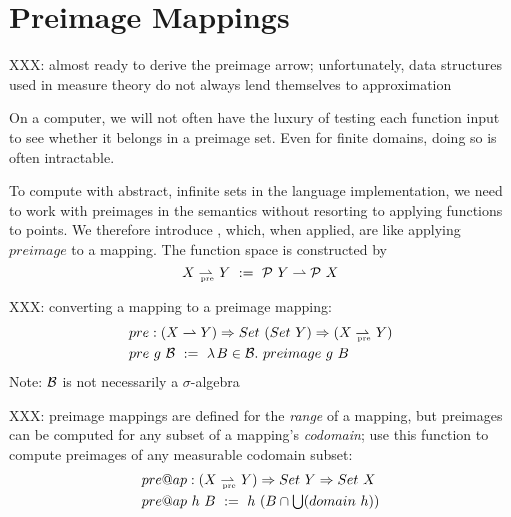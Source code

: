 \documentclass[preprint]{sigplanconf}
\newcommand{\pto}{\rightharpoonup}
\newcommand{\pre}{_\mathrm{pre}}
\newcommand{\prepto}{\pto_{\mspace{-19mu}\pre}}
\begin{document}

\section{Preimage Mappings}

XXX: almost ready to derive the preimage arrow; unfortunately, data structures used in measure theory do not always lend themselves to approximation

On a computer, we will not often have the luxury of testing each function input to see whether it belongs in a preimage set.
Even for finite domains, doing so is often intractable.

To compute with abstract, infinite sets in the language implementation, we need to work with preimages in the semantics without resorting to applying functions to points.
We therefore introduce , which, when applied, are like applying $preimage$ to a mapping.
The function space is constructed by
\begin{equation}
	X \prepto Y \ := \ \powerset~Y \pto \powerset~X
\end{equation}

XXX: converting a mapping to a preimage mapping:
\begin{equation}
\begin{aligned}
	&pre : (X \pto Y) \tto Set~(Set~Y) \tto (X \prepto Y) \\
	&pre~g~\B \ := \ \fun{B \in \B}{preimage~g~B}
\end{aligned}
\end{equation}
Note: $\mathcal{B}$ is not necessarily a $\sigma$-algebra

XXX: preimage mappings are defined for the \emph{range} of a mapping, but preimages can be computed for any subset of a mapping's \emph{codomain}; use this function to compute preimages of any measurable codomain subset:
\begin{equation}
\begin{aligned}
	&pre@ap : (X \prepto Y) \tto Set~Y \tto Set~X \\
	&pre@ap~h~B \ := \ h~(B \i \U(domain~h))
\end{aligned}
\end{equation}
\end{document}
